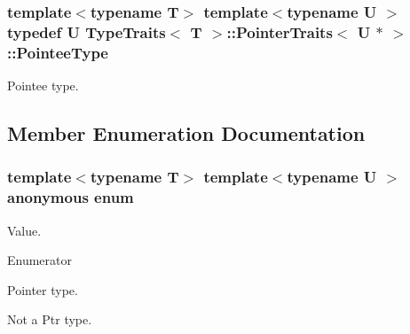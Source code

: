 \subsubsection[{\texorpdfstring{Pointee\+Type}{PointeeType}}]{\setlength{\rightskip}{0pt plus 5cm}template$<$typename T$>$ template$<$typename U $>$ typedef U {\bf Type\+Traits}$<$ T $>$\+::{\bf Pointer\+Traits}$<$ U $\ast$ $>$\+::{\bf Pointee\+Type}}\hypertarget{structTypeTraits_1_1PointerTraits_3_01U_01_5_01_4_ab1fb47a171ebefcd1275e91baa3b7b73}{}\label{structTypeTraits_1_1PointerTraits_3_01U_01_5_01_4_ab1fb47a171ebefcd1275e91baa3b7b73}
Pointee type. 

\subsection{Member Enumeration Documentation}
\subsubsection[{\texorpdfstring{anonymous enum}{anonymous enum}}]{\setlength{\rightskip}{0pt plus 5cm}template$<$typename T$>$ template$<$typename U $>$ anonymous enum}\hypertarget{structTypeTraits_1_1PointerTraits_3_01U_01_5_01_4_aa7cd8f8cbce42367285255b763869563}{}\label{structTypeTraits_1_1PointerTraits_3_01U_01_5_01_4_aa7cd8f8cbce42367285255b763869563}
Value. \begin{Desc}
\item[Enumerator]\par
\begin{description}
\item[{\em 
Is\+Pointer\hypertarget{structTypeTraits_1_1PointerTraits_3_01U_01_5_01_4_aa7cd8f8cbce42367285255b763869563a65cc154c13b6fc6cd5b7ada21a1fc079}{}\label{structTypeTraits_1_1PointerTraits_3_01U_01_5_01_4_aa7cd8f8cbce42367285255b763869563a65cc154c13b6fc6cd5b7ada21a1fc079}
}]Pointer type. \item[{\em 
Is\+Ptr\hypertarget{structTypeTraits_1_1PointerTraits_3_01U_01_5_01_4_aa7cd8f8cbce42367285255b763869563a54e37622c3c2ec85a6fc8de99589e749}{}\label{structTypeTraits_1_1PointerTraits_3_01U_01_5_01_4_aa7cd8f8cbce42367285255b763869563a54e37622c3c2ec85a6fc8de99589e749}
}]Not a Ptr type. \end{description}
\end{Desc}

